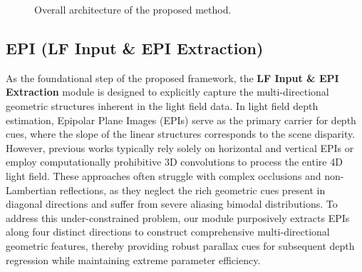 \documentclass[lettersize,journal]{IEEEtran}
\begin{document}
\begin{figure}[!t]
\caption{Overall architecture of the proposed method.}
\label{fig:architecture}
\end{figure}

\subsection{EPI (LF Input \& EPI Extraction)}

As the foundational step of the proposed framework, the \textbf{LF Input & EPI Extraction} module is designed to explicitly capture the multi-directional geometric structures inherent in the light field data. In light field depth estimation, Epipolar Plane Images (EPIs) serve as the primary carrier for depth cues, where the slope of the linear structures corresponds to the scene disparity. However, previous works typically rely solely on horizontal and vertical EPIs or employ computationally prohibitive 3D convolutions to process the entire 4D light field. These approaches often struggle with complex occlusions and non-Lambertian reflections, as they neglect the rich geometric cues present in diagonal directions and suffer from severe aliasing bimodal distributions. To address this under-constrained problem, our module purposively extracts EPIs along four distinct directions to construct comprehensive multi-directional geometric features, thereby providing robust parallax cues for subsequent depth regression while maintaining extreme parameter efficiency.
\end{document}
